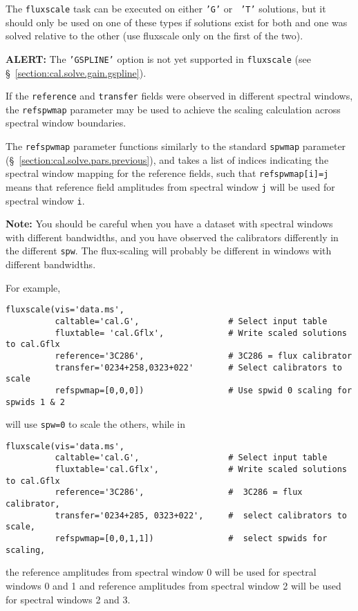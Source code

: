 {The {\tt fluxscale} task can be executed on either {\tt 'G'} or {\tt
'T'} solutions, but it should only be used on one of these types if
solutions exist for both and one was solved relative to the other (use
fluxscale only on the first of the two).  

{\bf ALERT:} The {\tt 'GSPLINE'} option is not yet supported in
{\tt fluxscale} (see \S~\ref{section:cal.solve.gain.gspline}).

If the {\tt reference} and {\tt transfer} fields were observed in different
spectral windows, the {\tt refspwmap} parameter may be used
to achieve the scaling calculation across spectral window boundaries.

The {\tt refspwmap} parameter functions similarly to the standard
{\tt spwmap} parameter (\S~\ref{section:cal.solve.pars.previous}),
and takes a list of indices
indicating the spectral window mapping for the reference fields,
such that {\tt refspwmap[i]=j} means that reference field amplitudes
from spectral window {\tt j} will be used for spectral window {\tt i}.

{\bf Note:} You should be careful when you have a dataset with
spectral windows with different bandwidths, and you
have observed the calibrators differently in the different {\tt spw}.
The flux-scaling will probably be different in windows with different
bandwidths.

For example,
\small
\begin{verbatim}
fluxscale(vis='data.ms',
          caltable='cal.G',                  # Select input table
          fluxtable= 'cal.Gflx',             # Write scaled solutions to cal.Gflx
          reference='3C286',                 # 3C286 = flux calibrator
          transfer='0234+258,0323+022'       # Select calibrators to scale
          refspwmap=[0,0,0])                 # Use spwid 0 scaling for spwids 1 & 2
\end{verbatim}
\normalsize
will use {\tt spw=0} to scale the others, while in
\small
\begin{verbatim}
fluxscale(vis='data.ms',
          caltable='cal.G',                  # Select input table
          fluxtable='cal.Gflx',              # Write scaled solutions to cal.Gflx
          reference='3C286',                 #  3C286 = flux calibrator,
          transfer='0234+285, 0323+022',     #  select calibrators to scale,
          refspwmap=[0,0,1,1])               #  select spwids for scaling,
\end{verbatim}
\normalsize
the reference amplitudes from spectral window 0 will be
used for spectral windows 0 and 1 and reference amplitudes from
spectral window 2 will be used for spectral windows 2 and 3.

}
